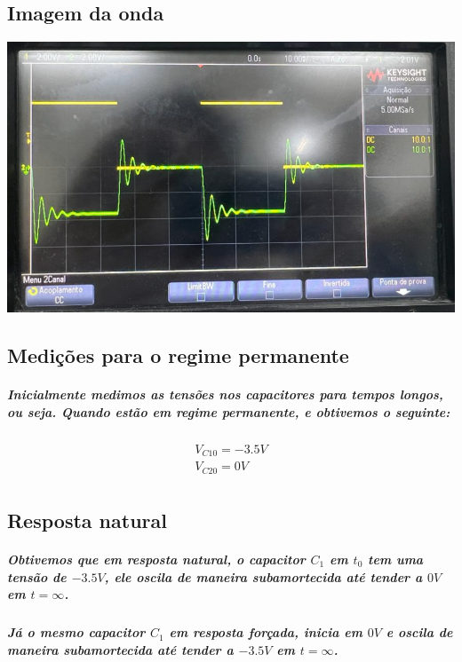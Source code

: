 \documentclass[12pt,twoside, a4paper, twocolumn]{article}
\begin{document}
\subsection{Imagem da onda}

\begin{adjustbox}{scale=0.25}
    \includegraphics{Figure_1.png}
\end{adjustbox}

\subsection{Medições para o regime permanente}

\subparagraph*{Inicialmente medimos as tensões nos capacitores para tempos longos, ou seja. Quando estão em regime permanente, e obtivemos o seguinte:}

\begin{equation*}
    \begin{aligned}
        V_{C10} = -3.5V \\
        V_{C20} = 0V    \\
    \end{aligned}
\end{equation*}

\subsection{Resposta natural}

\subparagraph*{Obtivemos que em resposta natural, o capacitor $C_1$ em $t_0$ tem uma tensão de $-3.5V$, ele oscila de maneira subamortecida até tender a $0V$ em $t = \infty$.}

\subparagraph*{Já o mesmo capacitor $C_1$ em resposta forçada, inicia em $0V$ e oscila de maneira subamortecida até tender a $-3.5V$ em $t = \infty$.}
\end{document}
